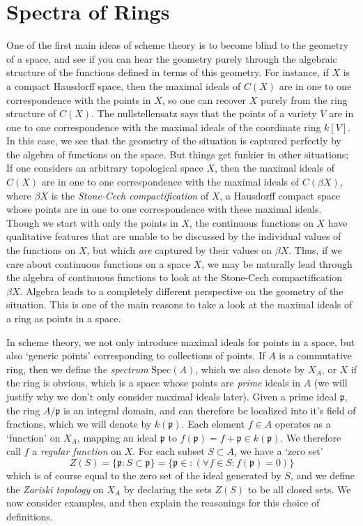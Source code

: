 \section{Spectra of Rings}

One of the first main ideas of scheme theory is to become blind to the geometry of a space, and see if you can hear the geometry purely through the algebraic structure of the functions defined in terms of this geometry. For instance, if $X$ is a compact Hausdorff space, then the maximal ideals of $C(X)$ are in one to one correspondence with the points in $X$, so one can recover $X$ purely from the ring structure of $C(X)$. The nullstellensatz says that the points of a variety $V$ are in one to one correspondence with the maximal ideals of the coordinate ring $k[V]$. In this case, we see that the geometry of the situation is captured perfectly by the algebra of functions on the space. But things get funkier in other situations; If one considers an arbitrary topological space $X$, then the maximal ideals of $C(X)$ are in one to one correspondence with the maximal ideals of $C(\beta X)$, where $\beta X$ is the {\it Stone-Cech compactification} of $X$, a Hausdorff compact space whose points are in one to one correspondence with these maximal ideals. Though we start with only the points in $X$, the continuous functions on $X$ have qualitative features that are unable to be discussed by the individual values of the functions on $X$, but which {\it are} captured by their values on $\beta X$. Thus, if we care about continuous functions on a space $X$, we may be naturally lead through the algebra of continuous functions to look at the Stone-Cech compactification $\beta X$. Algebra leads to a completely different perspective on the geometry of the situation. This is one of the main reasons to take a look at the maximal ideals of a ring as points in a space.

In scheme theory, we not only introduce maximal ideals for points in a space, but also `generic points' corresponding to collections of points. If $A$ is a commutative ring, then we define the \emph{spectrum} $\text{Spec}(A)$, which we also denote by $X_A$, or $X$ if the ring is obvious, which is a space whose points are {\it prime} ideals in $A$ (we will justify why we don't only consider maximal ideals later). Given a prime ideal $\mathfrak{p}$, the ring $A/\mathfrak{p}$ is an integral domain, and can therefore be localized into it's field of fractions, which we will denote by $k(\mathfrak{p})$. Each element $f \in A$ operates as a `function' on $X_A$, mapping an ideal $\mathfrak{p}$ to $f(\mathfrak{p}) = f + \mathfrak{p} \in k(\mathfrak{p})$. We therefore call $f$ a \emph{regular function} on $X$. For each subset $S \subset A$, we have a `zero set'
%
\[ Z(S) = \{ \mathfrak{p}: S \subset \mathfrak{p} \} = \{ \mathfrak{p} \in : (\forall f \in S: f(\mathfrak{p}) = 0) \} \]
%
which is of course equal to the zero set of the ideal generated by $S$, and we define the \emph{Zariski topology} on $X_A$ by declaring the sets $Z(S)$ to be all closed sets. We now consider examples, and then explain the reasonings for this choice of definitions.

